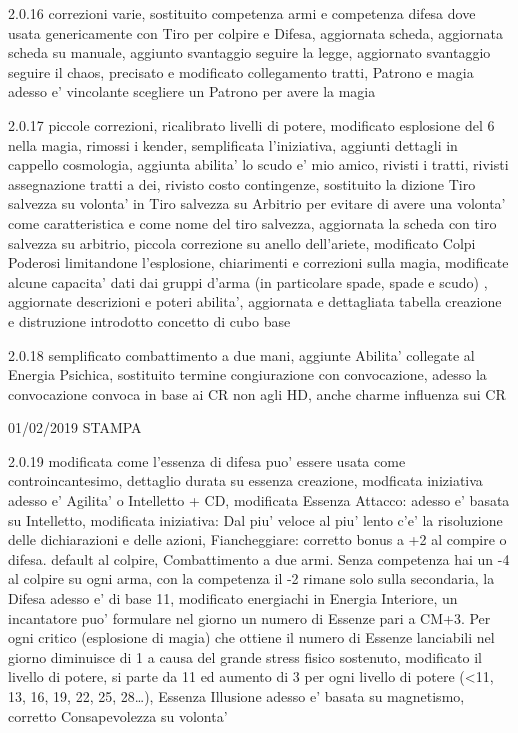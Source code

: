 \documentclass[a4paper,11pt,twoside,openany]{book}
\begin{document}
{{2.0.16 correzioni varie, sostituito competenza armi e competenza difesa dove usata genericamente con Tiro per colpire e Difesa, aggiornata scheda, aggiornata scheda su manuale, aggiunto svantaggio seguire la legge, aggiornato svantaggio seguire il chaos, precisato e modificato collegamento tratti, Patrono e magia adesso e' vincolante scegliere un Patrono per avere la magia

2.0.17 piccole correzioni, ricalibrato livelli di potere, modificato esplosione del 6 nella magia, rimossi i kender, semplificata l'iniziativa, aggiunti dettagli in cappello cosmologia, aggiunta abilita' lo scudo e' mio amico, rivisti i tratti, rivisti assegnazione tratti a dei, rivisto costo contingenze, sostituito la dizione Tiro salvezza su volonta' in Tiro salvezza su Arbitrio per evitare di avere una volonta' come caratteristica e come nome del tiro salvezza, aggiornata la scheda con tiro salvezza su arbitrio, piccola correzione su anello dell'ariete, modificato Colpi Poderosi limitandone l'esplosione, chiarimenti e correzioni sulla magia, modificate alcune capacita' dati dai gruppi d'arma (in particolare spade, spade e scudo) , aggiornate descrizioni e poteri abilita', aggiornata e dettagliata tabella creazione e distruzione introdotto concetto di cubo base

2.0.18 semplificato combattimento a due mani, aggiunte Abilita' collegate al Energia Psichica, sostituito termine congiurazione con convocazione, adesso la convocazione convoca in base ai CR non agli HD, anche charme influenza sui CR

01/02/2019 STAMPA

2.0.19 modificata come l'essenza di difesa puo' essere usata come controincantesimo, dettaglio durata su essenza creazione, modficata iniziativa adesso e' Agilita' o Intelletto + CD, modificata Essenza Attacco: adesso e' basata su Intelletto, modificata iniziativa: Dal piu' veloce al piu' lento c'e' la risoluzione delle dichiarazioni e delle azioni, Fiancheggiare: corretto bonus a +2 al compire o difesa. default al colpire, Combattimento a due armi. Senza competenza hai un -4 al colpire su ogni arma, con la competenza il -2 rimane solo sulla secondaria, la Difesa adesso e' di base 11, modificato energiachi in Energia Interiore, un incantatore puo' formulare nel giorno un numero di Essenze pari a CM+3. Per ogni critico (esplosione di magia) che ottiene il numero di Essenze lanciabili nel giorno diminuisce di 1 a causa del grande stress fisico sostenuto, modificato il livello di potere, si parte da 11 ed aumento di 3 per ogni livello di potere (\textless11, 13, 16, 19, 22, 25, 28\ldots ), Essenza Illusione adesso e' basata su magnetismo, corretto Consapevolezza su volonta'

}}
\end{document}
